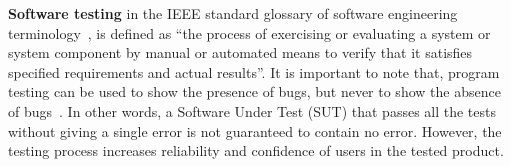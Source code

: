 

{\textbf {Software testing}} in the IEEE standard glossary of software engineering terminology~\cite{american1984}, is defined as ``the process of exercising or evaluating a system or system component by manual or automated means to verify that it satisfies specified requirements and actual results''. It is important to note that, program testing can be used to show the presence of bugs, but never to show the absence of bugs~\cite{Dijkstra1972}. In other words, a Software Under Test (SUT) that passes all the tests without giving a single error is not guaranteed to contain no error. However, the testing process increases reliability and confidence of users in the tested product.

